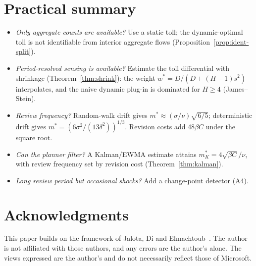 \documentclass[11pt]{article}
\theoremstyle{definition}
\theoremstyle{remark}
\begin{document}
\section{Practical summary}\label{sec:practice}
\begin{itemize}
\item \emph{Only aggregate counts are available?} Use a static toll; the dynamic-optimal toll is not identifiable from interior aggregate flows (Proposition~\ref{prop:ident-split}).
\item \emph{Period-resolved sensing is available?} Estimate the toll differential with shrinkage (Theorem~\ref{thm:shrink}): the weight $w^*=D/(D+(H-1)s^2)$ interpolates, and the naive dynamic plug-in is dominated for $H\ge4$ (James--Stein).
\item \emph{Review frequency?} Random-walk drift gives $m^*\approx(\sigma/\nu)\sqrt{6/5}$; deterministic drift gives $m^*=(6\sigma^2/(13\delta^2))^{1/3}$. Revision costs add $48\beta C$ under the square root.
\item \emph{Can the planner filter?} A Kalman/EWMA estimate attains $m_K^*=4\sqrt{\beta C}/\nu$, with review frequency set by revision cost (Theorem~\ref{thm:kalman}).
\item \emph{Long review period but occasional shocks?} Add a change-point detector (A4).
\end{itemize}

\section*{Acknowledgments}
This paper builds on the framework of Jalota, Di and Elmachtoub~\cite{jde2026}. The author is not affiliated with those authors, and any errors are the author's alone. The views expressed are the author's and do not necessarily reflect those of Microsoft.
\end{document}
